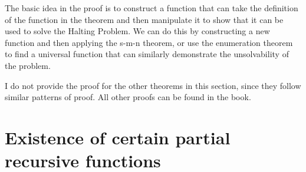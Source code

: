 \documentclass[openany]{book}
\begin{document}
\begin{mynote}
    The basic idea in the proof is to construct a function that can take the definition of the function in the theorem and then manipulate it to show that it can be used to solve the Halting Problem. We can do this by constructing a new function and then applying the s-m-n theorem, or use the enumeration theorem to find a universal function that can similarly demonstrate the unsolvability of the problem.
\end{mynote}
I do not provide the proof for the other theorems in this section, since they follow similar patterns of proof. All other proofs can be found in the book. 
\section{Existence of certain partial recursive functions}
\end{document}
